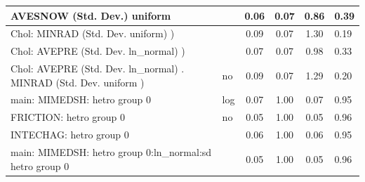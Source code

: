 \begin{table}
\begin{center}
\begin{tabular}{|l|l|c|c|c|l|}
			\hline
			AVESNOW (Std. Dev.) uniform &  & 0.06 & 0.07 & 0.86 & 0.39 \\
			\hline
			 Chol: MINRAD (Std. Dev. uniform) ) &  & 0.09 & 0.07 & 1.30 & 0.19 \\
			\hline
			 Chol: AVEPRE (Std. Dev. ln_normal) ) &  & 0.07 & 0.07 & 0.98 & 0.33 \\
			\hline
			 Chol: AVEPRE (Std. Dev. ln_normal) . MINRAD (Std. Dev.   uniform ) & no & 0.09 & 0.07 & 1.29 & 0.20 \\
			\hline
			main: MIMEDSH: hetro group 0 & log & 0.07 & 1.00 & 0.07 & 0.95 \\
			\hline
			FRICTION: hetro group 0 & no & 0.05 & 1.00 & 0.05 & 0.96 \\
			\hline
			INTECHAG: hetro group 0 &  & 0.06 & 1.00 & 0.06 & 0.95 \\
			\hline
			main: MIMEDSH: hetro group 0:ln_normal:sd  hetro group 0 &  & 0.05 & 1.00 & 0.05 & 0.96 \\
			\hline
		\end{tabular}
	\end{center}
\end{table}